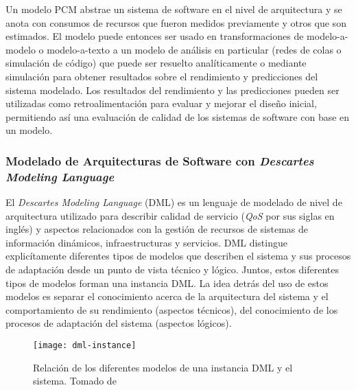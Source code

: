 Un modelo PCM abstrae un sistema de software en el nivel de arquitectura y se anota con consumos de recursos que fueron medidos previamente y otros que son estimados. El modelo puede entonces ser usado en transformaciones de modelo-a-modelo o modelo-a-texto a un modelo de análisis en particular (redes de colas o simulación de código) que puede ser resuelto analíticamente o mediante simulación para obtener resultados sobre el rendimiento y predicciones del sistema modelado. Los resultados del rendimiento y las predicciones pueden ser utilizadas como retroalimentación para evaluar y mejorar el diseño inicial, permitiendo así una evaluación de calidad de los sistemas de software con base en un modelo\cite{Noorshams2015_1000046750}.


\subsubsection{Modelado de Arquitecturas de Software con \emph{Descartes Modeling Language}} \label{sec:dml}
El \emph{Descartes Modeling Language} (DML) es un lenguaje de modelado de nivel de arquitectura utilizado para describir calidad de servicio (\emph{QoS} por sus siglas en inglés) y aspectos relacionados con la gestión de recursos de sistemas de información dinámicos, infraestructuras y servicios. DML distingue explicítamente diferentes tipos de modelos que describen el sistema y sus procesos de adaptación desde un punto de vista técnico y lógico. Juntos, estos diferentes tipos de modelos forman una instancia DML. La idea detrás del uso de estos modelos es separar el conocimiento acerca de la arquitectura del sistema y el comportamiento de su rendimiento (aspectos técnicos), del conocimiento de los procesos de adaptación del sistema (aspectos lógicos)\cite{KoBrHu2014-TechReport-DML}.

\begin{figure}[h]
  \centering
  \texttt{[image: dml-instance]}
  \caption[Relación de los diferentes modelos de una instancia DML y el sistema]{Relación de los diferentes modelos de una instancia DML y el sistema. Tomado de \protect\cite{KoBrHu2014-TechReport-DML}}
  \label{fig:dml-instance}
\end{figure}

